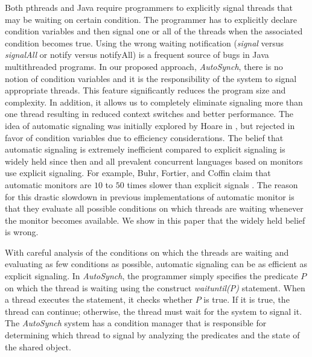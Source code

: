 \documentclass[preprint]{sigplanconf}
\begin{document}
Both pthreads and Java require programmers to explicitly
signal threads that may be waiting on certain condition. The programmer
has to explicitly declare condition variables and then signal one
or all of the threads when the associated condition becomes true.
Using the wrong waiting notification ({\em signal} versus {\em signalAll} or notify
versus notifyAll) is a frequent source of bugs in Java multithreaded
programs. In our proposed approach, {\em AutoSynch}, there is no notion of condition variables
and it is the responsibility of the system to signal appropriate threads.
This feature significantly reduces the program size and complexity.
In addition, it allows us to completely eliminate signaling more than 
one thread resulting in reduced context switches and better performance.
The idea of automatic signaling was initially explored by Hoare in \cite{hoa74},
but rejected in favor of condition variables due to efficiency considerations.
The belief that automatic signaling is extremely inefficient compared to
explicit signaling is widely held since then and
all prevalent concurrent languages based on monitors use
explicit signaling.
For example, Buhr, Fortier, and Coffin claim that automatic monitors are $10$ to $50$ times
slower than explicit signals \cite{bfc95}. The reason for this drastic slowdown in 
previous implementations of automatic monitor  is that they evaluate
all possible conditions on which threads are waiting whenever the monitor
becomes available. We show in this
paper that the widely held belief is wrong.

 With careful analysis of the conditions on which
the threads are waiting and evaluating as few conditions as possible, automatic signaling can be as efficient 
as explicit signaling.
In {\em AutoSynch}, the programmer simply specifies the predicate $P$ on which the thread is 
waiting using the construct {\em waituntil(P)} statement. 
When a thread executes the statement, it checks whether $P$ is true. If it is true, the thread can continue; 
otherwise, the thread must wait for the system to signal it. The {\em
AutoSynch} system has a condition manager that is responsible for determining
which thread to signal by analyzing the predicates and the state of the shared object. 
\end{document}
